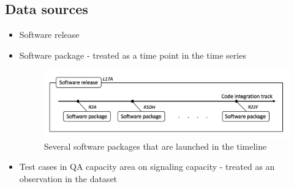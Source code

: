 \documentclass{beamer}
\begin{document}
\subsection{Data sources}
\begin{frame}[fragile]

\begin{itemize}
	\item Software release
	\item Software package - treated as a time point in the time series

	\begin{figure}
		\includegraphics[width=0.8\linewidth]{Release}
		\caption{Several software packages that are launched in the timeline}
	\end{figure}

	\item Test cases \footnotesize{in QA capacity area on signaling capacity} \normalsize{- treated as an observation in the dataset}
\end{itemize}

\end{frame}


\end{document}

